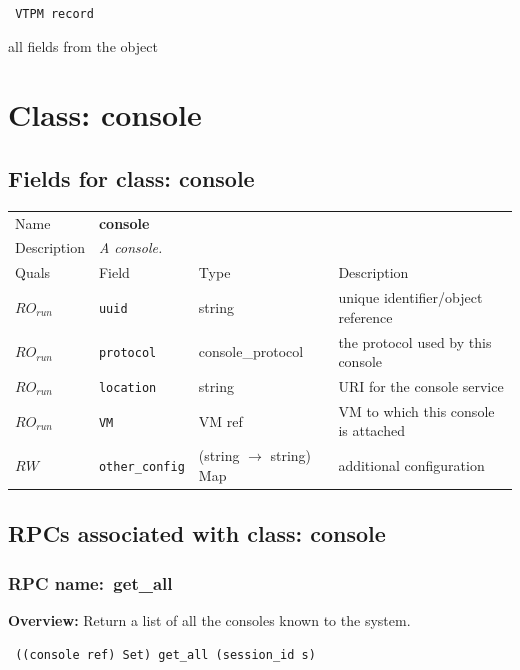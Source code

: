 \vspace{0.3cm}

{\tt 
VTPM record
}


all fields from the object
\vspace{0.3cm}
\vspace{0.3cm}
\vspace{0.3cm}

\vspace{1cm}
\newpage
\section{Class: console}
\subsection{Fields for class: console}
\begin{longtable}{|lllp{}|}
\hline
\multicolumn{1}{|l}{Name} & \multicolumn{3}{l|}{\bf console} \\
\multicolumn{1}{|l}{Description} & \multicolumn{3}{l|}{\parbox{11cm}{\em A
console.}} \\
\hline
Quals & Field & Type & Description \\
\hline
$\mathit{RO}_\mathit{run}$ &  {\tt uuid} & string & unique identifier/object reference \\
$\mathit{RO}_\mathit{run}$ &  {\tt protocol} & console\_protocol & the protocol used by this console \\
$\mathit{RO}_\mathit{run}$ &  {\tt location} & string & URI for the console service \\
$\mathit{RO}_\mathit{run}$ &  {\tt VM} & VM ref & VM to which this console is attached \\
$\mathit{RW}$ &  {\tt other\_config} & (string $\rightarrow$ string) Map & additional configuration \\
\hline
\end{longtable}
\subsection{RPCs associated with class: console}
\subsubsection{RPC name:~get\_all}

{\bf Overview:} 
Return a list of all the consoles known to the system.

\begin{verbatim} ((console ref) Set) get_all (session_id s)\end{verbatim}


